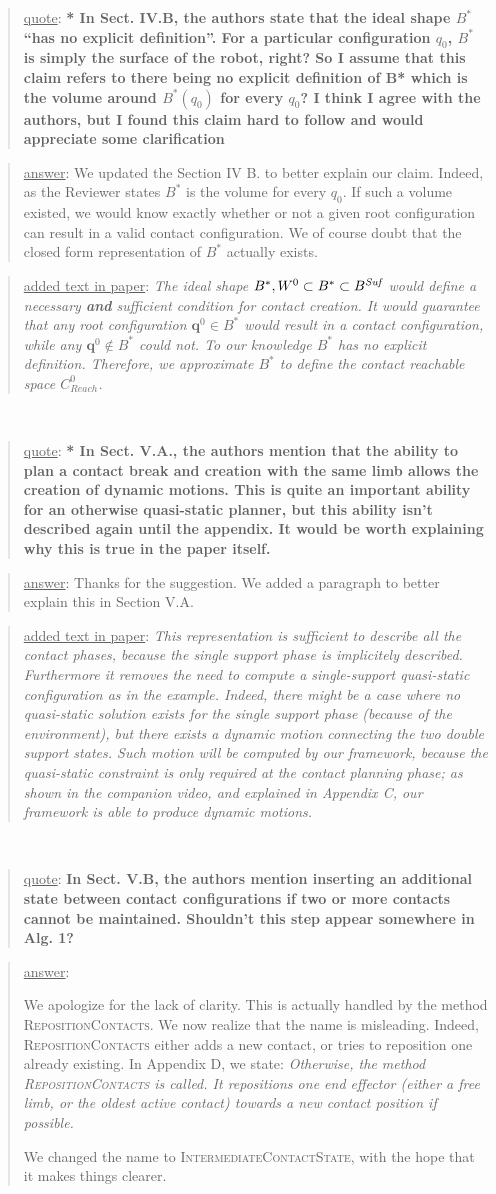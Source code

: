 \documentclass[a4paper]{article}
\newcommand{\done}[0]{}
\newcommand\quot[1]{\begin{quote} \underline{quote}: \textbf{#1}\end{quote}}
\newcommand\as[1]{\begin{quote} \underline{answer}: {#1}\end{quote} }
\newcommand\qt[1]{\begin{quote} \underline{added text in paper}: \textit{#1}\end{quote} \leavevmode \\ }
\begin{document}
\quot{* In Sect. IV.B, the authors state that the ideal shape $B^*$ ``has no
explicit definition''. For a particular configuration  $q_0$, $B^*$ is simply
the surface of the robot, right? So I assume that this claim refers to
there being no explicit definition of B* which is the volume around
$B^*(q_0)$ for every $q_0$? I think I agree with the authors, but I found
this claim hard to follow and would appreciate some clarification}
\as{We updated the Section IV B. to better explain our claim. Indeed, as the Reviewer states $B^*$  is the volume for every $q_0$. If such a volume existed, we would know exactly whether or not a given root configuration can result in a valid contact configuration.
We of course doubt that the closed form representation of $B^*$ actually exists. }
\qt{The ideal shape $B^*, W^0 \subset B^* \subset B^{\textrm{\it Suf}}$ would define a necessary \textbf{and} sufficient condition for contact creation. 
It would guarantee that any root configuration $\mathbf{q}^{0} \in B^*$ would result in a contact configuration, while any $\mathbf{q}^{0} \notin B^*$ could not.
To our knowledge  $B^*$ has no explicit definition.
Therefore, we approximate $B^*$ to define the contact reachable space $C_{Reach}^0$.}\done

\quot{* In Sect. V.A., the authors mention that the ability to plan a contact
break and creation with the same limb allows the creation of dynamic
motions. This is quite an important ability for an otherwise
quasi-static planner, but this ability isn't described again until the
appendix. It would be worth explaining why this is true in the paper
itself. }
\as{Thanks for the suggestion. We added a paragraph to better explain this in Section V.A.}
\qt{This representation is sufficient to describe all the contact phases, because the single support phase is implicitely described. Furthermore it removes the need to compute a single-support quasi-static configuration as in the example. Indeed, there might be a case where no quasi-static solution exists for the single support phase (because of the environment), but
there exists a dynamic motion connecting the two double support states. Such motion will be computed by our framework, because the quasi-static constraint is only required at the contact planning phase; as shown in the companion video, and explained in Appendix C, our framework is able to produce dynamic motions.
}
\done

\quot{In Sect. V.B, the authors mention inserting an additional state
between contact configurations if two or more contacts cannot be
maintained. Shouldn't this step appear somewhere in Alg. 1?}
\as{We apologize for the lack of clarity. This is actually handled by the method \textsc{RepositionContacts}. We now realize that the name is misleading. Indeed,
\textsc{RepositionContacts} either adds a new contact, or tries to reposition one already existing. In Appendix D, we state:
\textit{Otherwise, the method \textsc{RepositionContacts} is called. It repositions one end effector (either a free
limb, or the oldest active contact) towards a new contact
position if possible. }

We changed the name to \textsc{IntermediateContactState}, with the hope that it makes things clearer.}\done
\end{document}
